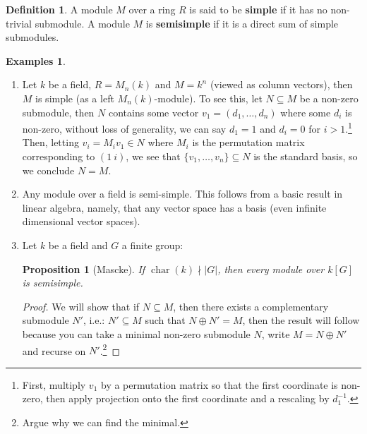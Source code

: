 \documentclass{tufte-handout} %
\newtheorem{prop}[thm]{Proposition}
\theoremstyle{definition}
\newtheorem{defn}[thm]{Definition}
\newtheorem{exmps}[thm]{Examples}
\theoremstyle{remark}
\DeclareMathOperator{\Char}{char}
\begin{document}
\begin{defn} A module $M$ over a ring $R$ is said to be \textbf{simple} if it has no non-trivial submodule. A module $M$ is \textbf{semisimple} if it is a direct sum of simple submodules.
\end{defn}
\begin{exmps}\label{exmpsemisimple}
	\begin{enumerate}
		\item Let $k$ be a field, $R = M_n(k)$ and $M = k^n$ (viewed as column vectors), then $M$ is simple (as a left $M_n(k)$-module). To see this, let $N \subseteq M$ be a non-zero submodule, then $N$ contains some vector $v_1= (d_1, \dots, d_n)$ where some $d_i$ is non-zero, without loss of generality, we can say $d_1 = 1$ and $d_i = 0$ for $i> 1$.\footnote{First, multiply $v_1$ by a permutation matrix so that the first coordinate is non-zero, then apply projection onto the first coordinate and a rescaling by $d_1^{-1}$.} Then, letting $v_i = M_i v_1 \in N$ where $M_i$ is the permutation matrix corresponding to $(1\ i)$, we see that $\{v_1, \dots, v_n\} \subseteq N$ is the standard basis, so we conclude $N = M$.
		\item Any module over a field is semi-simple. This follows from a basic result in linear algebra, namely, that any vector space has a basis (even infinite dimensional vector spaces).
		\item Let $k$ be a field and $G$ a finite group: \begin{prop}[Mascke]If $\Char(k) \nmid |G|$, then every module over $k[G]$ is semisimple.\end{prop}
		\begin{proof}
			We will show that if $N \subseteq M$, then there exists a complementary submodule $N'$, i.e.: $N' \subseteq M$ such that $N\oplus N' = M$, then the result will follow because you can take a minimal non-zero submodule $N$, write $M = N \oplus N'$ and recurse on $N'$.\footnote{Argue why we can find the minimal.}
			

\end{proof}
\end{enumerate}
\end{exmps}
\end{document}
